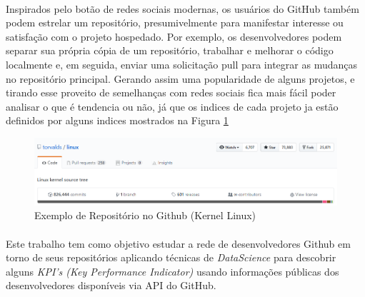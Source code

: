 \paragraph{}
Inspirados pelo botão de redes sociais modernas, os usuários do GitHub também podem estrelar um repositório, presumivelmente para manifestar interesse ou satisfação com o projeto hospedado\cite{gousios2014exploratory, gousios2015work}. Por exemplo, os desenvolvedores podem separar sua própria cópia de um repositório, trabalhar e melhorar o código localmente e, em seguida, enviar uma solicitação pull para integrar as mudanças no repositório principal\cite{borges2016understanding}. Gerando assim uma popularidade de alguns projetos, e tirando esse proveito de semelhanças com redes sociais fica mais fácil poder analisar o que é tendencia ou não, já que os indices de cada projeto ja estão definidos por alguns indices mostrados na Figura \ref{fig:github-linux}
\begin{figure}[h!]
    \centering
    \includegraphics[width=\linewidth]{assets/images/github-linux.PNG}
    \caption{Exemplo de Repositório no Github (Kernel Linux)}
    \label{fig:github-linux}
\end{figure}

\paragraph{}
Este trabalho tem como objetivo estudar a rede de desenvolvedores Github em torno de seus repositórios aplicando técnicas de \textit{DataScience} para descobrir alguns \textit{KPI's (Key Performance Indicator)} usando informações públicas dos desenvolvedores disponíveis via API do GitHub.

